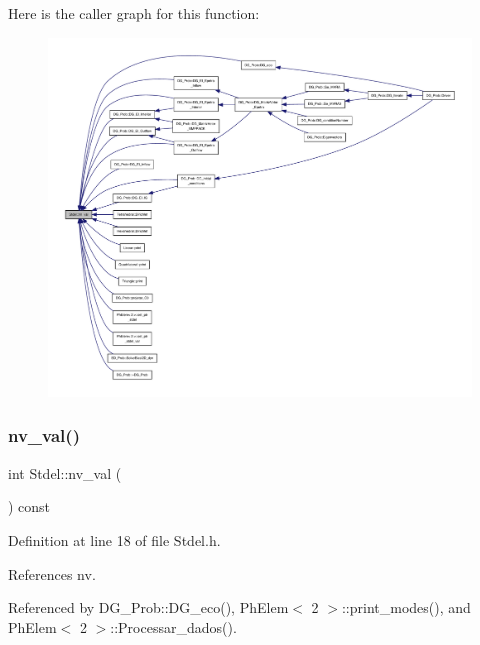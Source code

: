 Here is the caller graph for this function\+:
\nopagebreak
\begin{figure}[H]
\begin{center}
\leavevmode
\includegraphics[width=350pt]{classStdel_a6086dceed8fe3dd410da0d6b84f02377_icgraph}
\end{center}
\end{figure}
\mbox{\label{classStdel_ae2ab461d1bc8d9f6006665fe03684845}} 
\subsubsection{\texorpdfstring{nv\+\_\+val()}{nv\_val()}}
{\footnotesize\ttfamily int Stdel\+::nv\+\_\+val (\begin{DoxyParamCaption}{ }\end{DoxyParamCaption}) const\hspace{0.3cm}{\ttfamily [inline]}}



Definition at line 18 of file Stdel.\+h.



References nv.



Referenced by D\+G\+\_\+\+Prob\+::\+D\+G\+\_\+eco(), Ph\+Elem$<$ 2 $>$\+::print\+\_\+modes(), and Ph\+Elem$<$ 2 $>$\+::\+Processar\+\_\+dados().


